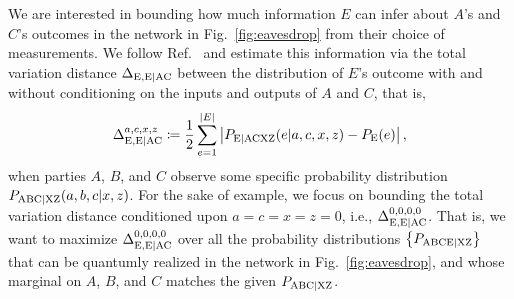 \documentclass[superscriptaddress,aps,prx,nofootinbib,twocolumn,twoside,reprint,letterpaper,longbibliography]{revtex4-2}
\DeclarePairedDelimiter{\abs}{\lvert}{\rvert}
\begin{document}
We are interested in bounding how much information $E$ can infer about $A$'s and $C$'s outcomes in the network in Fig.~\ref{fig:eavesdrop} from their choice of measurements.
We follow Ref.~\cite{lee2018crypto} and estimate this information via the total variation distance $\Delta_{\text{E},\text{E{\textbar}AC}}$ between the distribution of $E$'s outcome with and without conditioning on the inputs and outputs of $A$ and $C$, that is,
\begin{align}
\Delta_{\text{E},\text{E{\textbar}AC}}^{a,c,x,z}\coloneqq \frac{1}{2}\sum_{e=1}^{\abs{E}}\left|P_{\text{E{\textbar}ACXZ}}(e|a,c,x,z)-P_{\text{E}}(e)\right|,
\end{align}
when parties $A$, $B$, and $C$ observe some specific probability distribution $P_{\text{ABC{\textbar}XZ}}(a,b,c|x,z)$. For the sake of example, we focus on bounding the total variation distance conditioned upon ${a{=}c{=}x{=}z{=}0}$, i.e., $\Delta_{\text{E},\text{E{\textbar}AC}}^{0,0,0,0}$.
That is, we want to maximize $\Delta_{\text{E},\text{E{\textbar}AC}}^{0,0,0,0}$ over all the probability distributions $\left\{P_\text{ABCE{\textbar}XZ}\right\}$ that can be quantumly realized in the network in Fig.~\ref{fig:eavesdrop}, and whose marginal on $A$, $B$, and $C$ matches the given $P_{\text{ABC{\textbar}XZ}}$.
\end{document}
